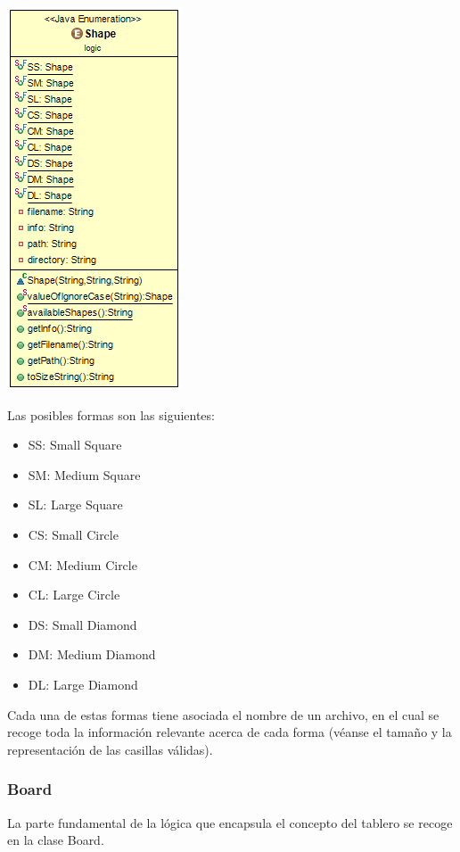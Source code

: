 \documentclass[../DocumentoOficial.tex]{subfiles}
\begin{document}
\begin{center}
\includegraphics[scale=0.55]{Shape-sprint7.png} 
\end{center}

Las posibles formas son las siguientes:
\begin{itemize}
\item SS: Small Square
\item SM: Medium Square
\item SL: Large Square
\item CS: Small Circle
\item CM: Medium Circle
\item CL: Large Circle
\item DS: Small Diamond
\item DM: Medium Diamond
\item DL: Large Diamond
\end{itemize}

Cada una de estas formas tiene asociada el nombre de un archivo, en el cual se recoge toda la información relevante acerca de cada forma (véanse el tamaño y la representación de las casillas válidas).

\subsubsection{Board}

La parte fundamental de la lógica que encapsula el concepto del tablero se recoge en la clase Board.
\end{document}
